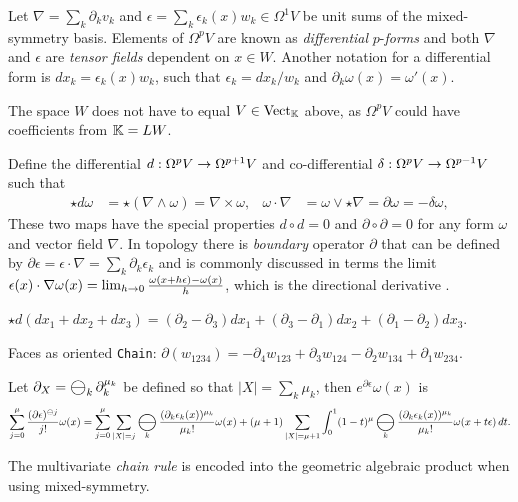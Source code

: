 \documentclass{juliacon}
\DeclareMathOperator*{\bigominus}{\scalerel*{\ominus}{\bigodot}}
\begin{document}
\begin{definition}
	Let $\nabla = \sum_k\partial_kv_k$ and $\epsilon = \sum_k\epsilon_k(x)w_k \in \Omega^1V$ be unit sums of the mixed-symmetry basis.
	Elements of $\Omega^pV$ are known as \textit{differential} $p$-\textit{forms} and both $\nabla$ and $\epsilon$ are \textit{tensor fields} dependent on $x\in W$.
	Another notation for a differential form is $dx_k = \epsilon_k(x)w_k$, such that $\epsilon_k = dx_k/w_k$ and $\partial_k\omega(x) = \omega'(x)$.
\end{definition}
\begin{note}
	The space $W$ does not have to equal $V\in\text{Vect}_{\mathbb{K}}$ above, as $\Omega^pV$ could have coefficients from $\mathbb{K} = LW$.
\end{note}
\begin{definition}
	Define \cite{bishop-goldberg} the differential $d:\Omega^p V\rightarrow\Omega^{p+1}V$ and co-differential $\delta:\Omega^pV\rightarrow\Omega^{p-1}V$ such that
	\begin{align*}
		\star d\omega &= \star(\nabla\wedge\omega) = \nabla\times\omega, & \omega\cdot\nabla &= \omega\vee\star\nabla = \partial\omega =-\delta\omega, 
	\end{align*}
	These two maps have the special properties $d\circ d=0$ and $\partial\circ\partial = 0$ for any form $\omega$ and vector field $\nabla$. 
	In topology there is \textit{boundary} operator $\partial$ that can be defined by $\partial\epsilon = \epsilon\cdot\nabla = \sum_k\partial_k\epsilon_k$ and is commonly discussed in terms the limit $\epsilon(x)\cdot\nabla\omega(x) = \lim_{h\rightarrow0} \frac{\omega(x+h\epsilon)-\omega(x)}{h}$, which is the directional derivative \cite{sobczyk}.
\end{definition}
\begin{example}
	$\star d(dx_1+dx_2+dx_3) = (∂_2 -∂_3)dx_1 + (∂_3 -∂_1)dx_2 + (∂_1 -∂_2)dx_3$.
\end{example}
\begin{example}
	Faces as oriented \verb`Chain`: $\partial(w_{1234}) = -\partial_4w_{123}+\partial_3w_{124}-\partial_2w_{134}+\partial_1w_{234}$.
\end{example}
\begin{theorem}
	Let $\partial_X=\bigominus_k\partial_k^{\mu_k}$ be defined so that $|X|=\sum_k\mu_k$, then $e^{\partial\epsilon}\omega(x)$ is
	\begin{align*}
		\sum_{j=0}^\mu \frac{(\partial\epsilon)^{\ominus j}}{j!}\omega(x)
		= \sum_{j=0}^\mu\sum_{|X|=j} \bigominus_k \frac{(\partial_{k}\epsilon_k(x))^{\mu_{k}}}{\mu_k!}\omega(x)
		+ (\mu+1)\sum_{|X|=\mu+1}\int_0^1(1-t)^\mu\bigominus_k\frac{(\partial_k\epsilon_k(x))^{\mu_k}}{\mu_k!}\omega(x+t\epsilon)\,dt.
	\end{align*}
\end{theorem}
The multivariate \textit{chain rule} is encoded into the geometric algebraic product when using mixed-symmetry.
\end{document}
